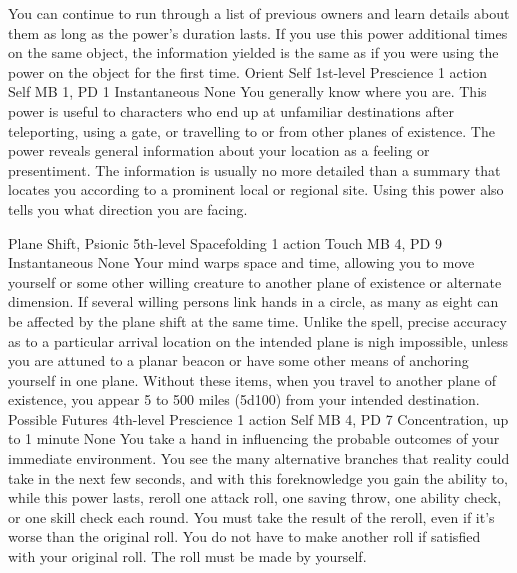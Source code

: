 You can continue to run through a list of previous owners
and learn details about them as long as the power's duration lasts.
If you use this power additional times on the same object,
the information yielded is the same
as if you were using the power on the object for the first time.
\DndPowerHeader%
    {Orient Self\label{pwr:orient-self}}
    {1st-level Prescience}
    {1 action}
    {Self}
    {MB 1, PD 1}
    {Instantaneous}
    {None}
You generally know where you are. This power
is useful to characters who end up at unfamiliar destinations
after teleporting, using a gate, or travelling to or from
other planes of existence. The power reveals general information
about your location as a feeling or presentiment. The information
is usually no more detailed than a summary that locates you
according to a prominent local or regional site. Using this
power also tells you what direction you are facing.

\DndPowerHeader%
    {Plane Shift, Psionic\label{pwr:plane-shift-psionic}}
    {5th-level Spacefolding}
    {1 action}
    {Touch}
    {MB 4, PD 9}
    {Instantaneous}
    {None}
Your mind warps space and time, allowing
you to move yourself or some other willing creature to another plane
of existence or alternate dimension. If several willing persons
link hands in a circle, as many as eight can be affected by
the plane shift at the same time. Unlike the  spell, precise accuracy as to a particular arrival
location on the intended plane is nigh impossible, unless
you are attuned to a planar beacon or have some other means
of anchoring yourself in one plane. Without these items, when
you travel to another plane of existence, you appear 5 to
500 miles (5d100) from your intended destination.
\DndPowerHeader%
    {Possible Futures\label{pwr:possible-futures}}
    {4th-level Prescience}
    {1 action}
    {Self}
    {MB 4, PD 7}
    {Concentration, up to 1 minute}
    {None}
You take a hand in influencing the probable
outcomes of your immediate environment. You see the many alternative
branches that reality could take in the next few seconds,
and with this foreknowledge you gain the ability to, while
this power lasts, reroll one attack roll, one saving throw,
one ability check, or one skill check each round. You must
take the result of the reroll, even if it's worse than the
original roll. You do not have to make another roll if satisfied
with your original roll. The roll must be made by yourself.

